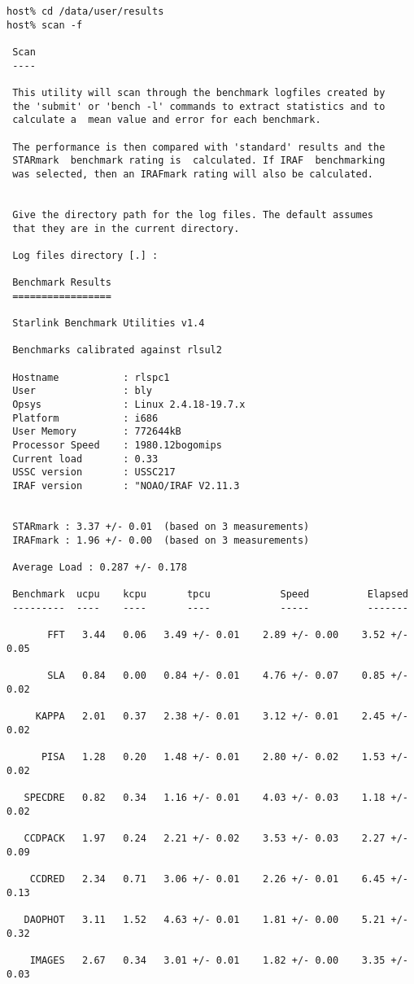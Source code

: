 \begin{verbatim}
host% cd /data/user/results
host% scan -f

 Scan
 ----

 This utility will scan through the benchmark logfiles created by
 the 'submit' or 'bench -l' commands to extract statistics and to
 calculate a  mean value and error for each benchmark.

 The performance is then compared with 'standard' results and the
 STARmark  benchmark rating is  calculated. If IRAF  benchmarking
 was selected, then an IRAFmark rating will also be calculated.


 Give the directory path for the log files. The default assumes
 that they are in the current directory.                       

 Log files directory [.] : 

 Benchmark Results
 =================

 Starlink Benchmark Utilities v1.4

 Benchmarks calibrated against rlsul2

 Hostname           : rlspc1
 User               : bly
 Opsys              : Linux 2.4.18-19.7.x
 Platform           : i686
 User Memory        : 772644kB
 Processor Speed    : 1980.12bogomips
 Current load       : 0.33
 USSC version       : USSC217
 IRAF version       : "NOAO/IRAF V2.11.3


 STARmark : 3.37 +/- 0.01  (based on 3 measurements)
 IRAFmark : 1.96 +/- 0.00  (based on 3 measurements)

 Average Load : 0.287 +/- 0.178

 Benchmark  ucpu    kcpu       tpcu            Speed          Elapsed
 ---------  ----    ----       ----            -----          -------

       FFT   3.44   0.06   3.49 +/- 0.01    2.89 +/- 0.00    3.52 +/- 0.05

       SLA   0.84   0.00   0.84 +/- 0.01    4.76 +/- 0.07    0.85 +/- 0.02

     KAPPA   2.01   0.37   2.38 +/- 0.01    3.12 +/- 0.01    2.45 +/- 0.02

      PISA   1.28   0.20   1.48 +/- 0.01    2.80 +/- 0.02    1.53 +/- 0.02

   SPECDRE   0.82   0.34   1.16 +/- 0.01    4.03 +/- 0.03    1.18 +/- 0.02

   CCDPACK   1.97   0.24   2.21 +/- 0.02    3.53 +/- 0.03    2.27 +/- 0.09

    CCDRED   2.34   0.71   3.06 +/- 0.01    2.26 +/- 0.01    6.45 +/- 0.13

   DAOPHOT   3.11   1.52   4.63 +/- 0.01    1.81 +/- 0.00    5.21 +/- 0.32

    IMAGES   2.67   0.34   3.01 +/- 0.01    1.82 +/- 0.00    3.35 +/- 0.03

\end{verbatim}

